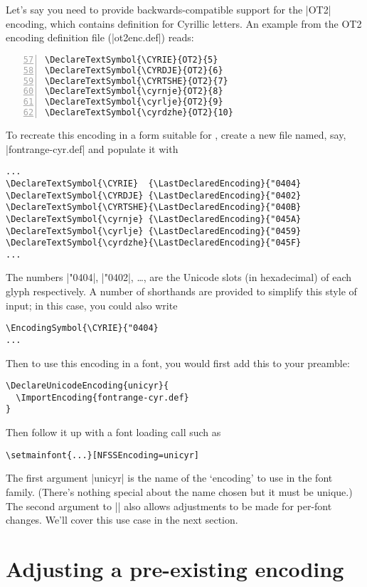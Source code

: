 \documentclass[a4paper]{ltxdoc}
\begin{document}
Let's say you need to provide backwards-compatible support for the |OT2| encoding,
which contains definition for Cyrillic letters.
An example from the OT2 encoding definition file (|ot2enc.def|) reads:
\begin{Verbatim}[numbers=left,firstnumber=57]
\DeclareTextSymbol{\CYRIE}{OT2}{5}
\DeclareTextSymbol{\CYRDJE}{OT2}{6}
\DeclareTextSymbol{\CYRTSHE}{OT2}{7}
\DeclareTextSymbol{\cyrnje}{OT2}{8}
\DeclareTextSymbol{\cyrlje}{OT2}{9}
\DeclareTextSymbol{\cyrdzhe}{OT2}{10}
\end{Verbatim}

To recreate this encoding in a form suitable for , create a new file
named, say, |fontrange-cyr.def| and populate it with
\begin{Verbatim}
...
\DeclareTextSymbol{\CYRIE}  {\LastDeclaredEncoding}{"0404}
\DeclareTextSymbol{\CYRDJE} {\LastDeclaredEncoding}{"0402}
\DeclareTextSymbol{\CYRTSHE}{\LastDeclaredEncoding}{"040B}
\DeclareTextSymbol{\cyrnje} {\LastDeclaredEncoding}{"045A}
\DeclareTextSymbol{\cyrlje} {\LastDeclaredEncoding}{"0459}
\DeclareTextSymbol{\cyrdzhe}{\LastDeclaredEncoding}{"045F}
...
\end{Verbatim}
The numbers |"0404|, |"0402|, \dots, are the Unicode slots (in hexadecimal)
of each glyph respectively.
A number of shorthands are provided to simplify this style of input; in this case,
you could also write
\begin{Verbatim}
\EncodingSymbol{\CYRIE}{"0404}
...
\end{Verbatim}

Then to use this encoding in a  font, you would first add this to your preamble:
\begin{Verbatim}
\DeclareUnicodeEncoding{unicyr}{
  \ImportEncoding{fontrange-cyr.def}
}
\end{Verbatim}
Then follow it up with a font loading call such as
\begin{Verbatim}
\setmainfont{...}[NFSSEncoding=unicyr]
\end{Verbatim}
The first argument |unicyr| is the name of the `encoding' to use in the
font family. (There's nothing special about the name chosen but it must be unique.)
The second argument to |\DeclareUnicodeEncoding| also allows adjustments to be made
for per-font changes.
We'll cover this use case in the next section.


\section{Adjusting a pre-existing encoding}
\end{document}
